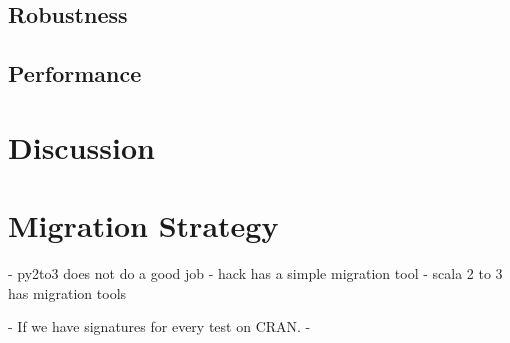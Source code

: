 \documentclass[screen,acmsmall]{acmart}
\begin{document}
\subsection{Robustness}

\subsection{Performance}

\section{Discussion}



\section{Migration Strategy}
- py2to3 does not do a good job
- hack has a simple migration tool
- scala 2 to 3 has migration tools

- If we have signatures for every test on CRAN.
- 



\end{document}
